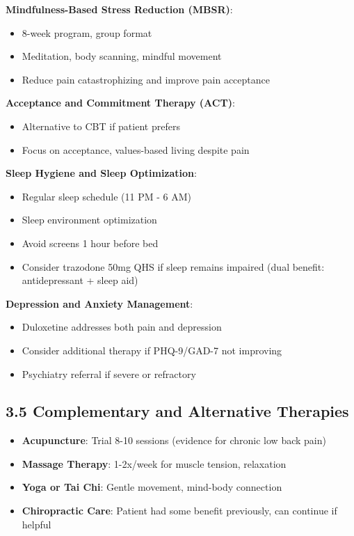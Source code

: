 \documentclass[11pt,letterpaper]{article}
\begin{document}
\textbf{Mindfulness-Based Stress Reduction (MBSR)}:
\begin{itemize}[leftmargin=*]
    \item 8-week program, group format
    \item Meditation, body scanning, mindful movement
    \item Reduce pain catastrophizing and improve pain acceptance
\end{itemize}

\textbf{Acceptance and Commitment Therapy (ACT)}:
\begin{itemize}[leftmargin=*]
    \item Alternative to CBT if patient prefers
    \item Focus on acceptance, values-based living despite pain
\end{itemize}

\textbf{Sleep Hygiene and Sleep Optimization}:
\begin{itemize}[leftmargin=*]
    \item Regular sleep schedule (11 PM - 6 AM)
    \item Sleep environment optimization
    \item Avoid screens 1 hour before bed
    \item Consider trazodone 50mg QHS if sleep remains impaired (dual benefit: antidepressant + sleep aid)
\end{itemize}

\textbf{Depression and Anxiety Management}:
\begin{itemize}[leftmargin=*]
    \item Duloxetine addresses both pain and depression
    \item Consider additional therapy if PHQ-9/GAD-7 not improving
    \item Psychiatry referral if severe or refractory
\end{itemize}

\subsection*{3.5 Complementary and Alternative Therapies}

\begin{itemize}[leftmargin=*]
    \item \textbf{Acupuncture}: Trial 8-10 sessions (evidence for chronic low back pain)
    \item \textbf{Massage Therapy}: 1-2x/week for muscle tension, relaxation
    \item \textbf{Yoga or Tai Chi}: Gentle movement, mind-body connection
    \item \textbf{Chiropractic Care}: Patient had some benefit previously, can continue if helpful
\end{itemize}
\end{document}
